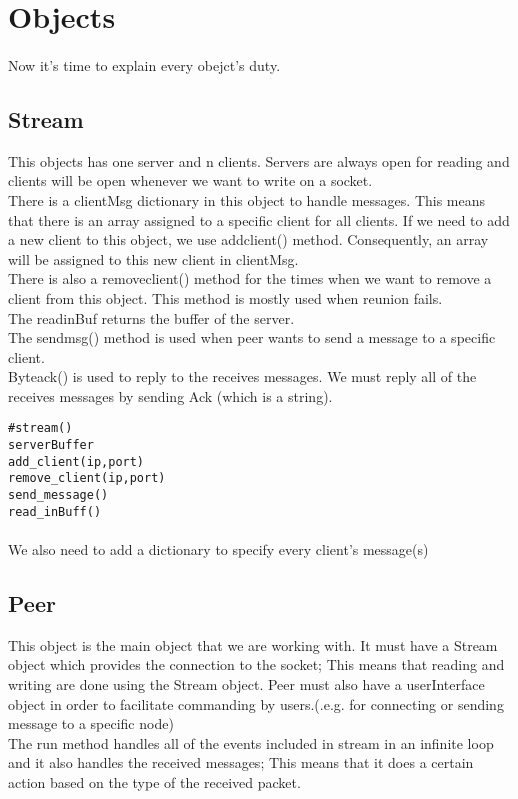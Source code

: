 \documentclass{article}
\begin{document}
\section{Objects}
\paragraph{}Now it's time to explain every obejct's duty.
\subsection{Stream}This objects has one server and n clients. Servers are always open for reading and clients will be open whenever we want to write on a socket. \\
There is a clientMsg dictionary in this object to handle messages. This means that there is an array assigned to a specific client for all clients. If we need to add a new client to this object, we use add\underline{\hspace{.05in}}client() method. Consequently, an array will be assigned to this new client in clientMsg.\\
There is also a remove\underline{\hspace{.05in}}client() method for the times when we want to remove a client from this object. This method is mostly used  when reunion fails.\\
The read\underline{\hspace{.05in}}inBuf returns the buffer of the server.\\
The send\underline{\hspace{.05in}}msg() method is used when peer wants to send a message to a specific client.\\
Byte\underline{\hspace{.05in}}ack() is used to reply to the receives messages. We must reply all of the receives messages by sending Ack (which is a string).\\
\begin{lstlisting}
#stream()
serverBuffer
add_client(ip,port)
remove_client(ip,port)
send_message()
read_inBuff()
\end{lstlisting}
\paragraph{}We also need to add a dictionary to specify every client's message(s)
\subsection{Peer}This object is the main object that we are working with. It must have a Stream object which provides the connection to the socket; This means that reading and writing are done using the Stream object. Peer must also have a userInterface object in order to facilitate commanding by users.(.e.g. for connecting or sending message to a specific node)\\
The run method handles all of the events included in stream in an infinite loop and it also handles the received messages; This means that it does a certain action based on the type of the received packet.
\end{document}
